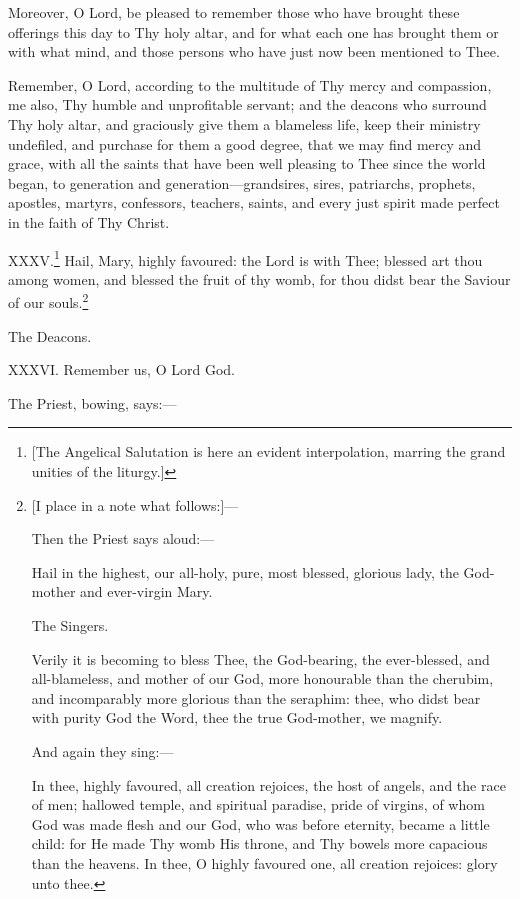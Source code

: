 Moreover, O Lord, be pleased to remember those who have brought these offerings this day to Thy holy altar, and for what each one has brought them or with what mind, and those persons who have just now been mentioned to Thee.

Remember, O Lord, according to the multitude of Thy mercy and compassion, me also, Thy humble and unprofitable servant; and the deacons who surround Thy holy altar, and graciously give them a blameless life, keep their ministry undefiled, and purchase for them a good degree, that we may find mercy and grace, with all the saints that have been well pleasing to Thee since the world began, to generation and generation—grandsires, sires, patriarchs, prophets, apostles, martyrs, confessors, teachers, saints, and every just spirit made perfect in the faith of Thy Christ.

XXXV.\footnote{\par{}  [The Angelical Salutation is here an evident interpolation, marring the grand unities of the liturgy.]} Hail, Mary, highly favoured: the Lord is with Thee; blessed art thou among women, and blessed the fruit of thy womb, for thou didst bear the Saviour of our souls.\footnote{\par{}  [I place in a note what follows:]—  \par Then the Priest says aloud:—  \par Hail in the highest, our all-holy, pure, most blessed, glorious lady, the God-mother and ever-virgin Mary.  \par The Singers.  \par Verily it is becoming to bless Thee, the God-bearing, the ever-blessed, and all-blameless, and mother of our God, more honourable than the cherubim, and incomparably more glorious than the seraphim: thee, who didst bear with purity God the Word, thee the true God-mother, we magnify.  \par And again they sing:—  \par In thee, highly favoured, all creation rejoices, the host of angels, and the race of men; hallowed temple, and spiritual paradise, pride of virgins, of whom God was made flesh and our God, who was before eternity, became a little child: for He made Thy womb His throne, and Thy bowels more capacious than the heavens. In thee, O highly favoured one, all creation rejoices: glory unto thee.}

The Deacons.

XXXVI. Remember us, O Lord God.

The Priest, bowing, says:—

